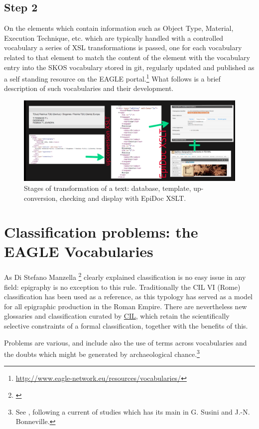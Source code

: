 \documentclass[amsthm,ebook]{saparticle}
\begin{document}
\subsection{Step 2}
On the elements which contain information such as Object Type, Material, Execution Technique, etc. which are typically handled with a controlled vocabulary a series of XSL transformations is passed, one for each vocabulary related to that element  to match the content of the element with the vocabulary entry into the SKOS vocabulary stored in git, regularly updated and published as a self standing resource on the EAGLE portal.\footnote{\url{http://www.eagle-network.eu/resources/vocabularies/}} What follows is a brief description of such vocabularies and their development.

\begin{figure}[htbp] \includegraphics[width=\columnwidth]{upconversion.png} \caption[]{Stages of transformation of a text: database, template, up-conversion, checking and display with EpiDoc XSLT.} \end{figure}

\section{Classification problems: the EAGLE Vocabularies}
As Di Stefano Manzella \footnote{\citet[109]{Manzella1987}} clearly explained classification is no easy issue in any field: epigraphy is no exception to this rule. Traditionally the CIL VI (Rome) classification has been used as a reference, as this typology has served as a model for all epigraphic production in the Roman Empire. There are nevertheless new glossaries and classification curated by \href{http://cil.bbaw.de/cil_en/dateien/glossar.php#auswahlglossar}{CIL}, which retain the scientifically selective constraints of a formal classification, together with the benefits of this.

Problems are various, and include also the use of terms across vocabularies and the doubts which might be generated by archaeological chance.\footnote{ See \citet[XI-XII]{Piso}, following a current of studies which has its main in G. Susini and J.-N. Bonneville.}
\end{document}
